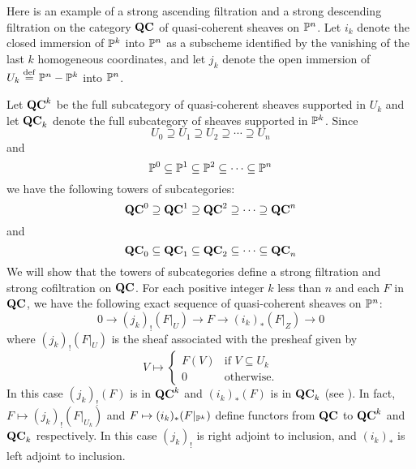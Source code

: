 \begin{ex}
Here is an example of a strong ascending filtration and a strong
descending filtration on the category $\QCoh$ of quasi-coherent
sheaves on $\P^n$. Let $i_k$ denote the closed immersion of $\P^k$ 
into $\P^n$ as a subscheme identified by the vanishing of the last 
$k$ homogeneous coordinates, and let $j_k$ denote the open 
immersion of $U_k \defeq \P^n - \P^k$ into $\P^n$. 

Let $\QCoh^k$ be the full subcategory of quasi-coherent sheaves
supported in $U_k$ and let $\QCoh_k$ denote the full subcategory
of sheaves supported in $\P^k$. Since 
\[
U_0 \supseteq U_1 \supseteq U_2 \supseteq \cdots \supseteq U_n
\]
and
\[
\P^0 \subseteq \P^1 \subseteq \P^2 \subseteq \cdots \subseteq \P^n
\]
we have the following towers of subcategories:
\[
\QCoh^0 \supseteq \QCoh^1 \supseteq \QCoh^2 \supseteq \cdots
   \supseteq \QCoh^n
\]
and 
\[
\QCoh_0 \subseteq \QCoh_1 \subseteq \QCoh_2 \subseteq \cdots
   \subseteq \QCoh_n
\]
We will show that the towers of subcategories define a strong 
filtration and strong cofiltration on $\QCoh$. For each positive 
integer $k$ less than $n$ and each $F$ in $\QCoh$, we have the 
following exact sequence of quasi-coherent sheaves on $\P^n$:
\begin{equation}\label{eq_qc_sheaf_ses}
0 \to (j_k)_!(F|_U) \to F \to (i_k)_*(F|_Z) \to 0
\end{equation}
where $(j_k)_!(F|_U)$ is the sheaf associated with the presheaf 
given by
\[
V \mapsto \begin{cases}
F(V) &\textrm{if }V \subseteq U_k\\
0    &\textrm{otherwise}.
\end{cases}
\]
In this case $(j_k)_!(F)$ is in $\QCoh^k$ and $(i_k)_*(F)$ is in 
$\QCoh_k$ (see \cite[Ex. 1.19]{Hart}). In fact, $F \mapsto 
(j_k)_!(F|_{U_k})$ and $F \mapsto (i_k)_*(F|_{\P^k})$ define
functors from $\QCoh$ to $\QCoh^k$ and $\QCoh_k$
respectively. In this case $(j_k)_!$ is right adjoint to 
inclusion, and $(i_k)_*$ is left adjoint to inclusion.


\end{ex}
